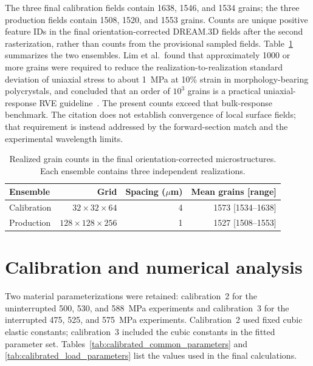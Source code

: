 \documentclass[final,12pt]{cas-sc}
\begin{document}
The three final calibration fields contain 1638, 1546, and 1534 grains; the
three production fields contain 1508, 1520, and 1553 grains. Counts are unique
positive feature IDs in the final orientation-corrected DREAM.3D fields after
the second rasterization, rather than counts from the provisional sampled
fields. Table~\ref{tab:realized_grain_counts} summarizes the two ensembles.
Lim et al.\ found that approximately 1000 or more grains were required to
reduce the realization-to-realization standard deviation of uniaxial stress
to about 1~MPa at 10\% strain in morphology-bearing polycrystals, and
concluded that an order of $10^3$ grains is a practical uniaxial-response RVE
guideline~\cite{lim2019rve}. The present counts exceed that bulk-response
benchmark. The citation does not establish convergence of local surface
fields; that requirement is instead addressed by the forward-section match
and the experimental wavelength limits.

\begin{table}[pos=htbp]
\centering
\caption{Realized grain counts in the final orientation-corrected
microstructures. Each ensemble contains three independent realizations.}
\label{tab:realized_grain_counts}
\begin{tabular}{lrrr}
\hline
Ensemble & Grid & Spacing ($\mu$m) & Mean grains [range] \\
\hline
Calibration & $32\times32\times64$ & 4 & 1573 [1534--1638] \\
Production & $128\times128\times256$ & 1 & 1527 [1508--1553] \\
\hline
\end{tabular}
\end{table}

\section{Calibration and numerical analysis}
\label{app:numerical}

Two material parameterizations were retained: calibration~2 for the
uninterrupted 500, 530, and 588~MPa experiments and calibration~3 for the
interrupted 475, 525, and 575~MPa experiments. Calibration~2 used fixed cubic
elastic constants; calibration~3 included the cubic constants in the fitted
parameter set. Tables~\ref{tab:calibrated_common_parameters} and
\ref{tab:calibrated_load_parameters} list the values used in the final
calculations.
\end{document}
